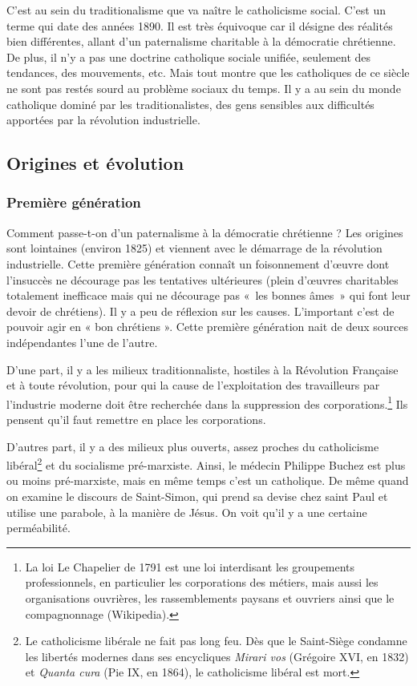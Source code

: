 \documentclass[12pt]{report}
\begin{document}
C’est au sein du traditionalisme que va naître le catholicisme social. C'est un terme qui date des années
1890. Il est très équivoque car il désigne des réalités bien différentes, allant d’un paternalisme charitable à la
démocratie chrétienne. De plus, il n’y a pas une doctrine catholique sociale unifiée,
seulement des tendances, des mouvements, etc. Mais tout montre que les catholiques de ce
siècle ne sont pas restés sourd au problème sociaux du temps. Il y a au sein du monde catholique
dominé par les traditionalistes, des gens sensibles aux difficultés apportées par la révolution
industrielle.


\subsection{Origines et évolution}

\subsubsection{Première génération}

Comment passe-t-on d’un paternalisme à la démocratie chrétienne ? Les origines sont
lointaines (environ 1825) et viennent avec le démarrage de la révolution industrielle. Cette
première génération connaît un foisonnement d’œuvre dont l’insuccès ne décourage pas les
tentatives ultérieures (plein d’œuvres charitables totalement inefficace mais qui ne décourage
pas «~les bonnes âmes~» qui font leur devoir de chrétiens). Il y a peu de réflexion sur les
causes. L’important c’est de pouvoir agir en « bon chrétiens ». Cette première génération nait
de deux sources indépendantes l’une de l’autre.

D'une part, il y a les milieux traditionnaliste, hostiles à la Révolution Française et à toute révolution, pour qui la cause de l'exploitation des travailleurs par l'industrie moderne doit être recherchée dans la suppression des corporations.\footnote{La loi Le Chapelier de 1791 est une loi interdisant les groupements professionnels, en particulier les corporations des métiers, mais aussi les organisations ouvrières, les rassemblements paysans et ouvriers ainsi que le compagnonnage (Wikipedia).}
Ils pensent qu'il faut remettre en place les corporations.

D'autres part, il y a des milieux plus ouverts, assez proches du catholicisme libéral\footnote{Le catholicisme libérale ne fait pas long feu. Dès que le Saint-Siège condamne les libertés modernes dans ses encycliques \emph{Mirari vos} (Grégoire XVI, en 1832) et \emph{Quanta cura} (Pie IX, en 1864), le catholicisme libéral est mort.} et du socialisme pré-marxiste.
Ainsi, le médecin Philippe Buchez est plus ou moins pré-marxiste, mais en même temps c'est un catholique. De même quand on examine le discours de Saint-Simon, qui prend sa devise chez saint Paul et utilise une parabole, à la manière de Jésus. On voit qu'il y a une certaine perméabilité.
\end{document}
